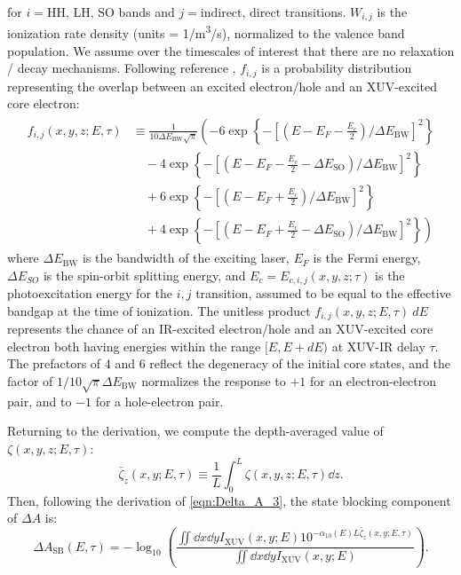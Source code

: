 for $i=\textrm{HH, LH, SO}$ bands and $j=\textrm{indirect, direct}$ transitions. $W_{i,j}$ is the ionization rate density (units = 1/m\textsuperscript{3}/s), normalized to the valence band population. We assume over the timescales of interest that there are no relaxation / decay mechanisms. Following reference \cite{zurchDirectSimultaneousObservation2017}, $f_{i,j}$ is a probability distribution representing the overlap between an excited electron/hole and an XUV-excited core electron:
\begin{align}
\begin{split}
f_{i,j}(x, y, z; E, \tau) &\equiv \frac{1}{10 \Delta E_{\textrm{BW}} \sqrt{\pi}} \left( -6 \exp \left\{- \left[ \left(E-E_F-\frac{E_c}{2} \right)/\Delta E_{\textrm{BW}} \right]^2 \right\} \right. \\
&\quad - 4 \exp \left\{- \left[ \left(E-E_F-\frac{E_c}{2}-\Delta E_{\textrm{SO}} \right)/\Delta E_{\textrm{BW}} \right]^2 \right\} \\
&\quad + 6 \exp \left\{- \left[ \left(E-E_F+\frac{E_c}{2} \right)/\Delta E_{\textrm{BW}} \right]^2 \right\} \\
&\left. \quad + 4 \exp \left\{- \left[ \left(E-E_F+\frac{E_c}{2}-\Delta E_{\textrm{SO}} \right)/\Delta E_{\textrm{BW}} \right]^2 \right\} \right)
\end{split}
\label{eqn:f_ij}
\end{align}
where $\Delta E_{\textrm{BW}}$ is the bandwidth of the exciting laser, $E_F$ is the Fermi energy, $\Delta E_{SO}$ is the spin-orbit splitting energy, and $E_c = E_{c,i,j}(x, y, z; \tau)$ is the photoexcitation energy for the $i,j$ transition, assumed to be equal to the effective bandgap at the time of ionization. The unitless product $f_{i,j}(x,y,z;E,\tau) \ dE$ represents the chance of an IR-excited electron/hole and an XUV-excited core electron both having energies within the range $[E, E+ dE)$ at XUV-IR delay $\tau$. The prefactors of 4 and 6 reflect the degeneracy of the initial core states, and the factor of $1 / 10 \sqrt{\pi} \Delta E_{\textrm{BW}}$ normalizes the response to $+1$ for an electron-electron pair, and to $-1$ for a hole-electron pair.

Returning to the derivation, we compute the depth-averaged value of $\zeta(x,y,z;E,\tau)$:
\begin{equation}
\bar{\zeta}_z(x, y; E, \tau) \equiv \frac{1}{L} \int_{0}^{L} \zeta(x,y,z;E,\tau) \dd{z}.
\label{eqn:zeta_z}
\end{equation}
Then, following the derivation of \cref{eqn:Delta_A_3}, the state blocking component of $\Delta A$ is:
\begin{equation}
\Delta A_{\textrm{SB}} (E, \tau) = -\log_{10} \left( \frac{ \iint \dd{x} \dd{y} I_{\textrm{XUV}}(x,y;E) 10^{- \alpha_{10}(E) L \bar{\zeta}_z(x,y;E,\tau)}}{ \iint \dd{x} \dd{y} I_{\textrm{XUV}}(x,y;E)} \right).
\label{eqn:Delta_A_4}
\end{equation}


